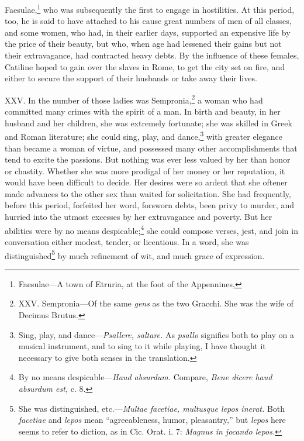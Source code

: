Faesulae,\footnote{Faesulae—A town of Etruria, at the foot of the Appennines,} who was subsequently the first to engage in hostilities.
At this period, too, he is said to have attached to his cause great
numbers of men of all classes, and some women, who had, in their earlier
days, supported an expensive life by the price of their beauty, but who,
when age had lessened their gains but not their extravagance, had
contracted heavy debts. By the influence of these females, Catiline
hoped to gain over the slaves in Rome, to get the city set on fire, and
either to secure the support of their husbands or take away their lives.

XXV. In the number of those ladies was Sempronia,\footnote{XXV. Sempronia—Of the same \emph{gens} as the two Gracchi. She
was the wife of Decimus Brutus.} a woman who had
committed many crimes with the spirit of a man. In birth and beauty,
in her husband and her children, she was extremely fortunate; she was
skilled in Greek and Roman literature; she could sing, play, and
dance,\footnote{Sing, play, and dance—\emph{Psallere, saltare.} As \emph{psallo}
signifies both to play on a musical instrument, and to sing to it
while playing, I have thought it necessary to give both senses in the
translation.} with greater elegance than became a woman of virtue, and
possessed many other accomplishments that tend to excite the passions.
But nothing was ever less valued by her than honor or chastity.
Whether she was more prodigal of her money or her reputation, it would
have been difficult to decide. Her desires were so ardent that she
oftener made advances to the other sex than waited for solicitation.
She had frequently, before this period, forfeited her word, forsworn
debts, been privy to murder, and hurried into the utmost excesses by
her extravagance and poverty. But her abilities were by no means
despicable;\footnote{By no means despicable—\emph{Haud absurdum.} Compare, \emph{Bene dicere
haud absurdum est,} c. 8.} she could compose verses, jest, and join in
conversation either modest, tender, or licentious. In a word, she was
distinguished\footnote{She was distinguished, etc.—\emph{Multae facetiae, multusque lepos
inerat.} Both \emph{facetiae} and \emph{lepos} mean ``agreeableness, humor,
pleasantry,'' but \emph{lepos} here seems to refer to diction, as in Cic.
Orat. i. 7: \emph{Magnus in jocando lepos.}} by much refinement of wit, and much grace of
expression.

